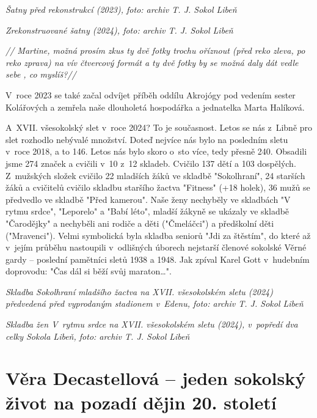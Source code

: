 \documentclass[a5paper, 12pt, twoside]{article}
\begin{document}

\textit{Šatny před rekonstrukcí (2023), foto: archiv T. J. Sokol Libeň}


\textit{Zrekonstruované šatny (2024), foto: archiv T. J. Sokol Libeň}

\textit{// Martine, možná prosím zkus ty dvě fotky trochu oříznout (před
reko zleva, po reko zprava) na vív čtvercový formát a ty dvě fotky by se
možná daly dát vedle sebe , co myslíš?//}

V~roce 2023 se také začal odvíjet příběh oddílu Akrojógy pod vedením
sester Kolářových a zemřela naše dlouholetá hospodářka a jednatelka
Marta Halíková.

A~XVII. všesokolský slet v~roce 2024? To je současnost. Letos se nás
z~Libně pro slet rozhodlo nebývalé množství. Doteď nejvíce nás bylo na
posledním sletu v~roce 2018, a to 146. Letos nás bylo skoro o~sto více,
tedy přesně 240. Obsadili jsme 274 značek a cvičili v~10 z~12 skladeb.
Cvičilo 137 dětí a 103 dospělých. Z~mužských složek cvičilo 22 mladších
žáků ve skladbě "Sokolhraní", 24 starších žáků a cvičitelů cvičilo
skladbu staršího žactva "Fitness" (+18 holek), 36 mužů se předvedlo ve
skladbě "Před kamerou". Naše ženy nechyběly ve skladbách "V rytmu
srdce", "Leporelo" a "Babí léto", mladší žákyně se ukázaly ve
skladbě "Čarodějky" a nechyběli ani rodiče a děti ("Čmeláčci") a
předškolní děti ("Mravenci"). Velmi symbolická byla skladba seniorů
"Jdi za štěstím", do které až v~jejím průběhu nastoupili v~odlišných
úborech nejstarší členové sokolské Věrné gardy -- poslední pamětníci
sletů 1938 a 1948. Jak zpíval Karel Gott v~hudebním doprovodu: "Čas dál
si běží svůj maraton\ldots".


\textit{Skladba Sokolhraní mladšího žactva na XVII. všesokolském sletu
(2024) předvedená před vyprodaným stadionem v~Edenu, foto: archiv T. J.
Sokol Libeň}


\textit{Skladba žen V~rytmu srdce na XVII. všesokolském sletu (2024),
v~popředí dva celky Sokola Libeň, foto: archiv T. J. Sokol Libeň}

\section{Věra Decastellová -- jeden sokolský život na pozadí dějin 20.
století}
\end{document}
